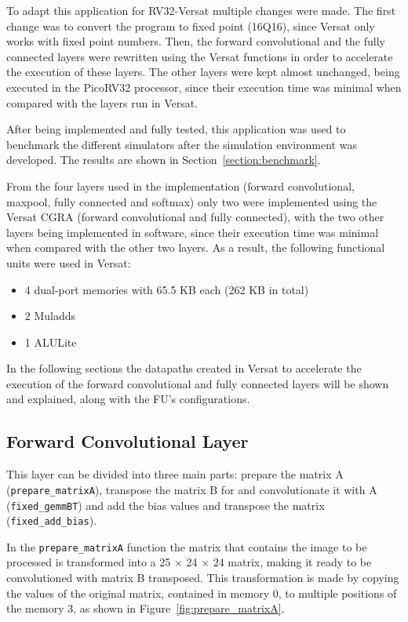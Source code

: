 To adapt this application for RV32-Versat multiple changes were made. The first
change was to convert the program to fixed point (16Q16), since Versat only
works with fixed point numbers. Then, the forward convolutional and the fully
connected layers were rewritten using the Versat functions in order to
accelerate the execution of these layers.  The other layers were kept almost
unchanged, being executed in the PicoRV32 processor, since their execution time
was minimal when compared with the layers run in Versat.

After being implemented and fully tested, this application was used to benchmark
the different simulators after the simulation environment was developed. The
results are shown in Section~\ref{section:benchmark}.

From the four layers used in the implementation (forward convolutional, maxpool, fully
connected and softmax) only two were implemented using the Versat \ac{CGRA} (forward
convolutional and fully connected), with the two other layers being implemented in
software, since their execution time was minimal when compared with the other two layers.
As a result, the following functional units were used in Versat:
\begin{itemize}
	\item 4 dual-port memories with 65.5 KB each (262 KB in total)
	\item 2 Muladds
	\item 1 ALULite
\end{itemize}

In the following sections the datapaths created in Versat to accelerate the
execution of the forward convolutional and fully connected layers will be shown
and explained, along with the FU's configurations.

\subsection{Forward Convolutional Layer}
\label{subsection:fconvlayer}

This layer can be divided into three main parts: prepare the matrix A
({\tt prepare\_matrixA}), transpose the matrix B for and convolutionate it with A
({\tt fixed\_gemmBT}) and add the bias values and transpose the matrix
({\tt fixed\_add\_bias}).

In the {\tt prepare\_matrixA} function the matrix that contains the image
to be processed is transformed into a 25 $\times$ 24 $\times$ 24 matrix, making
it ready to be convolutioned with matrix B transposed. This transformation is
made by copying the values of the original matrix, contained in memory 0, to
multiple positions of the memory 3, as shown in Figure~\ref{fig:prepare_matrixA}.

